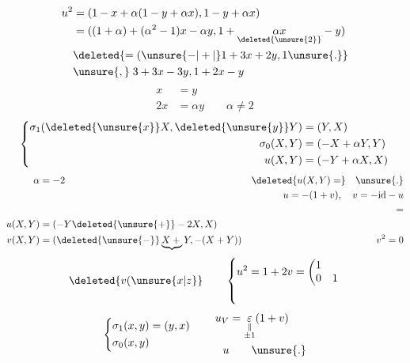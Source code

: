 \[
\begin{aligned}
u^2&=(1-x+\alpha(1-y+\alpha x),1-y+\alpha x)\\
&=((1+\alpha)+(\alpha^2-1)x-\alpha y,1+\underset{\deleted{\unsure{2}}}{\alpha x}-y)\\
&\deleted{=(\unsure{-|+|{}}1+3x+2y,1\unsure{.}}\\
&\unsure{,}\;3+3x-3y,1+2x-y
\end{aligned}
\]
\[
\begin{aligned} x&=y\\2x&=\alpha y\qquad\alpha\ne2\end{aligned}
\]
\[
\left\{\begin{aligned}
\sigma_1(\deleted{\unsure{x}}X,\deleted{\unsure{y}}Y)&=(Y,X)\\
\sigma_0(X,Y)&=(-X+\alpha Y,Y)\\
u(X,Y)&=(-Y+\alpha X,X)
\end{aligned}\right.
\]
\[
\begin{aligned}
\alpha&=-2 &\deleted{u(X,Y)=}\quad\unsure{.}\\
&&u=-(1+v),\quad v=-\mathrm{id}-u\\
&&\hspace{9em}=\\
u(X,Y)&=(-Y\deleted{\unsure{+}}-2X,X)\\
v(X,Y)&=(\deleted{\unsure{-}}\underbrace{X+{}}Y,-(X+Y)) & v^2=0
\end{aligned}
\]
\[
\deleted{v(\unsure{x|z}}\qquad
\left\{\begin{aligned} u^2&=1+2v=\left(\begin{matrix}1&\\0&1\end{matrix}\right.\\ &\phantom{1}\end{aligned}\right.
\]
\[
\left\{\begin{aligned}\sigma_1(x,y)&=(y,x)\\\sigma_0(x,y)&\end{aligned}\right.
\qquad\begin{aligned}
u_V&=\underset{\substack{\parallel\\\pm1}}{\varepsilon}(1+v)\\
u&\qquad\unsure{.}
\end{aligned}
\]

